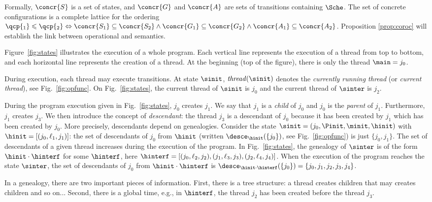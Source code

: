 \documentclass[12pt]{article}
\renewcommand{\subset}{\subseteq}
\newcommand{\thread}{\mathit{thread}}
\begin{document}
Formally, \(\concr{S}\) is a set of states, and \(\concr{G}\) and \(\concr{A}\) are sets of transitions containing \(\Sche\).
The set of concrete configurations is a complete lattice for the ordering \(\qcp{_1}\leqslant\qcp{_2} \Leftrightarrow \concr{S_1}\subset\concr{S_2}\wedge\concr{G_1}\subset\concr{G_2}\wedge\concr{A_1}\subset\concr{A_2}  \).
Proposition \ref{prop:coroc} will establish the link between operational and \cname semantics.



 \mondessinstates
 

 
Figure~\ref{fig:states} illustrates the execution of a whole program. Each vertical line represents the execution of a thread from top to bottom, and each horizontal line represents the creation of a thread. At the beginning (top of the figure), there is only the thread \(\main=j_0\). 

During execution, each thread may execute transitions. At state \(\sinit\), \(\thread(\sinit)\) denotes the \emph{currently running thread} (or \emph{current thread}), see Fig.~\ref{fig:opfunc}. On Fig.~\ref{fig:states}, the current thread of \(\sinit\) is \(j_0\) and the current thread of \(\sinter\) is \(j_2\).

During the program execution given in Fig.~\ref{fig:states}, \(j_0\) creates \(j_1\). We say that \(j_1\) is a \emph{child} of \(j_0\) and \(j_0\) is the \emph{parent} of \(j_1\). Furthermore, \(j_1\) creates \(j_3\). We then  introduce the concept of \emph{descendant}: the thread \(j_3\) is a descendant of \(j_0\) because it has been created by \(j_1\) which has been created by \(j_0\). More precisely, descendants depend on genealogies. Consider the state \(\sinit=(j_0,\Pinit,\minit,\hinit)\) with \(\hinit=[(j_0,\ell_1,j_1)]\): the set of descendants of \(j_0\) from \(\hinit\) (written \(\desce_{\hinit}(\{j_0\})\), see Fig.~\ref{fig:opfunc}) is just \(\{j_0,j_1\}\).
 The set of descendants of a given thread increases during the execution of the program. In Fig.~\ref{fig:states}, the genealogy of \(\sinter\) is of the form \(\hinit\cdot \hinterf\) for some \(\hinterf\), here \(\hinterf=[(j_0,\ell_2,j_2),(j_1,\ell_3,j_3),(j_2,\ell_4,j_4)]\). When the execution of the program reaches the state \(\sinter\), the set of descendants of \(j_0\) from \(\hinit\cdot \hinterf\) is \(\desce_{\hinit\cdot\hinterf}(\{j_0\})=\{j_0,j_1,j_2,j_3,j_4\}\).
 
In a genealogy, there are two important pieces of information. First, there is a tree structure: a thread creates children that may creates children and so on... Second, there is a global time, e.g., in \(\hinterf\), the thread \(j_2\) has been created before the thread \(j_3\).
\end{document}
